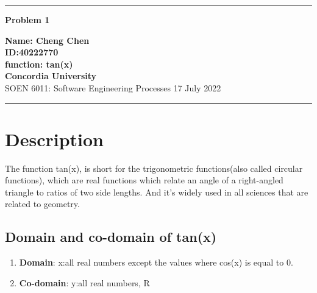 \documentclass[10pt,a4paper,twoside]{article}
\begin{document}
\begin{center}
\hrule
\vspace{.4cm}
{\bf {\Huge Problem 1}}
\vspace{.2cm}
\end{center}
{\bf Name: Cheng Chen}  \\
{\bf ID:40222770}\\
{\bf function: tan(x)}\\
{\bf Concordia University}\\
SOEN 6011: Software Engineering Processes {\bf  } \hspace{\fill}  17 July  2022 \\
\hrule







\section{Description}
The function tan(x), is short for the trigonometric functions(also called circular functions), which are real functions which relate an angle of a right-angled triangle to ratios of two side lengths. And it's widely used in all sciences that are related to geometry.
\cite{114514}
\subsection{Domain and co-domain of tan(x)}
\begin{enumerate}
\item 
\textbf{Domain}: x:all real numbers except the values where cos(x) is equal to 0.
\item
\textbf{Co-domain}: y:all real numbers, R
\end{enumerate}
\end{document}
